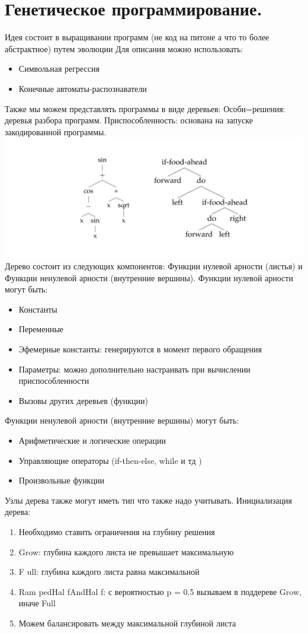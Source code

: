 \section{Генетическое программирование.}
Идея состоит в выращивании программ (не код на питоне а что то более абстрактное) путем эволюции
Для описания можно использовать:
\begin{itemize}
\item Символьная регрессия
\item Конечные автоматы-распознаватели
\end{itemize}
Также мы можем представлять программы в виде деревьев:
Особи=решения: деревья разбора программ. Приспособленность: основана на запуске закодированной программы. 
\includegraphics{images/evolv_gen}
Дерево состоит из следующих компонентов: Функции нулевой арности (листья) и Функции ненулевой арности (внутренние вершины).
Функции нулевой арности могут быть:
\begin{itemize}
	\item Константы
	\item Переменные
	\item Эфемерные константы: генерируются в момент первого обращения
	\item Параметры: можно дополнительно настраивать при вычислении приспособленности
	\item Вызовы других деревьев (функции)
\end{itemize}
Функции ненулевой арности (внутренние вершины) могут быть:
\begin{itemize}
	\item Арифметические и логические операции
	\item Управляющие операторы (if-then-else, while и тд )
	\item Произвольные функции
\end{itemize}
Узлы дерева также могут иметь тип что также надо учитывать. 
Инициализация дерева:
\begin{enumerate} 
	\item Необходимо ставить ограничения на глубину решения 
	\item Grow: глубина каждого листа не превышает максимальную
	\item F ull: глубина каждого листа равна максимальной
	\item Ram pedHal fAndHal f: с вероятностью p = 0.5 вызываем в поддереве Grow, иначе Full
	\item Можем балансировать между максимальной глубиной листа
\end{enumerate} 
